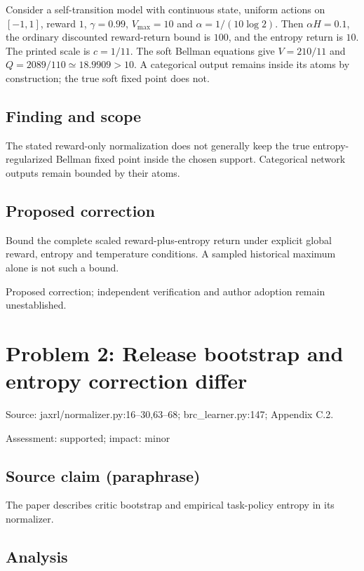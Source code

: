 \documentclass[11pt]{article}
\begin{document}
Consider a self-transition model with continuous state, uniform actions on \([-1,1]\), reward \(1\), \(\gamma=0.99\), \(V_{\max}=10\) and \(\alpha=1/(10\log2)\). Then \(\alpha H=0.1\), the ordinary discounted reward-return bound is \(100\), and the entropy return is \(10\). The printed scale is \(c=1/11\). The soft Bellman equations give \(V=210/11\) and \(Q=2089/110\simeq18.9909>10\). A categorical output remains inside its atoms by construction; the true soft fixed point does not.

\subsection*{Finding and scope}

The stated reward-only normalization does not generally keep the true entropy-regularized Bellman fixed point inside the chosen support. Categorical network outputs remain bounded by their atoms.

\subsection*{Proposed correction}

Bound the complete scaled reward-plus-entropy return under explicit global reward, entropy and temperature conditions. A sampled historical maximum alone is not such a bound.

Proposed correction; independent verification and author adoption remain unestablished.

\section*{Problem 2: Release bootstrap and entropy correction differ}

Source: jaxrl/normalizer.py:16–30,63–68; brc\_learner.py:147; Appendix C.2.

Assessment: supported; impact: minor

\subsection*{Source claim (paraphrase)}

The paper describes critic bootstrap and empirical task-policy entropy in its normalizer.

\subsection*{Analysis}
\end{document}
